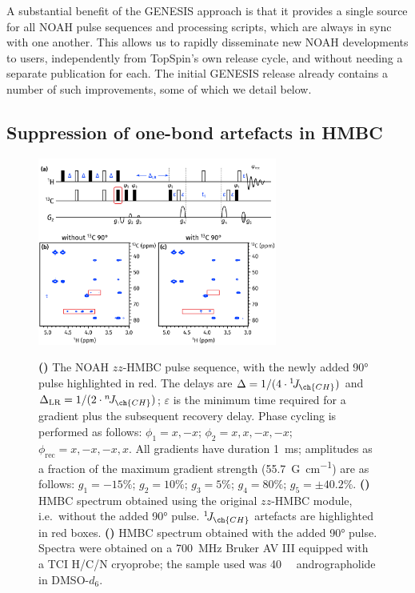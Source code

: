 \documentclass[a4paper,11pt]{article}
\newcommand{\carbon}{\ch{^{13}C}}
\newcommand{\onejch}{{}^1\!J_{\ch{CH}}}
\newcommand{\njch}{{}^n\!J_{\ch{CH}}}
\newcommand*{\andro}{Spectra were obtained on a \SI{700}{\MHz} Bruker AV III equipped with a TCI H/C/N cryoprobe; the sample used was \SI{40}{\milli\molar} andrographolide in DMSO-\(d_6\).}
\begin{document}
\begin{refsection}
A substantial benefit of the GENESIS approach is that it provides a single source for all NOAH pulse sequences and processing scripts, which are always in sync with one another.
This allows us to rapidly disseminate new NOAH developments to users, independently from TopSpin's own release cycle, and without needing a separate publication for each.
The initial GENESIS release already contains a number of such improvements, some of which we detail below.

\subsection{Suppression of one-bond artefacts in HMBC}

\begin{figure}[ht]
    \centering
    \includegraphics[width=0.7\textwidth]{hmbc_comp.png}
    {\label{fig:hmbc_comp_pulprog}}
    {\label{fig:hmbc_comp_before}}
    {\label{fig:hmbc_comp_after}}
    \caption{
        \textbf{()} The NOAH \(zz\)-HMBC pulse sequence, with the newly added \carbon{} \ang{90} pulse highlighted in red.
        The delays are \(\Delta = 1/(4 \cdot \onejch)\) and \(\Delta_{\text{LR}} = 1/(2 \cdot \njch)\); \(\varepsilon\) is the minimum time required for a gradient plus the subsequent recovery delay.
        Phase cycling is performed as follows: \(\phi_1 = x, -x\); \(\phi_2 = x, x, -x, -x\); \(\phi_{\text{rec}} = x, -x, -x, x\).
        All gradients have duration \SI{1}{ms}; amplitudes as a fraction of the maximum gradient strength (\SI{55.7}{G\per\cm}) are as follows: \(g_1 = -15\%\); \(g_2 = 10\%\); \(g_3 = 5\%\); \(g_4 = 80\%\); \(g_5 = \pm 40.2\%\).
        \textbf{()} HMBC spectrum obtained using the original \(zz\)-HMBC module, i.e.\ without the added \ang{90} pulse.
        \(\onejch{}\) artefacts are highlighted in red boxes.
        \textbf{()} HMBC spectrum obtained with the added \ang{90} pulse.
        \andro{}
    }
    \label{fig:hmbc_comp}
\end{figure}


\end{refsection}
\end{document}
